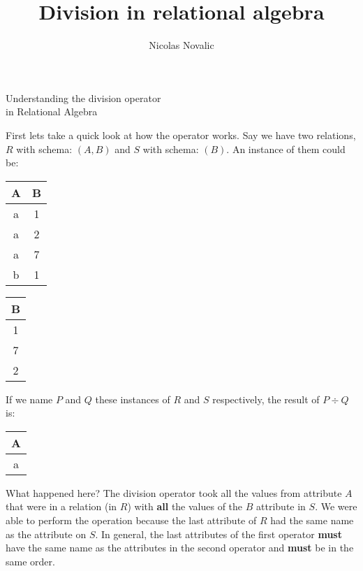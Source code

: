 \documentclass{article}
\begin{document}
\title{%
		\LARGE \textbf{Division in relational algebra} \\
        }
\author{
	Nicolas Novalic
}
\begin{center}
	{\Huge Understanding the division operator\\ in Relational Algebra} \\
\end{center}

First lets take a quick look at how the operator works. Say we have two relations, $R$ with schema: $(A, B)$ and $S$ with schema: $(B)$. An instance of them could be:
\vskip 0.2in

\parbox{.45\linewidth}{
\begin{center}
  \begin{tabular}{ll}
  	\hline
    A & B \\
    \hline
    \multicolumn{1}{|c|}{a} & \multicolumn{1}{c|}{1} \\ \hline
	\multicolumn{1}{|c|}{a} & \multicolumn{1}{c|}{2} \\ \hline
    \multicolumn{1}{|c|}{a} & \multicolumn{1}{c|}{7} \\ \hline
    \multicolumn{1}{|c|}{b} & \multicolumn{1}{c|}{1} \\ \hline
  \end{tabular}
\end{center}
}
\parbox{.45\linewidth}{
\begin{center}
  \begin{tabular}{l}
  	\hline
    B \\
    \hline
    \multicolumn{1}{|c|}{1} \\ \hline
	\multicolumn{1}{|c|}{7} \\ \hline
    \multicolumn{1}{|c|}{2} \\ \hline
  \end{tabular}
\end{center}
}
\vskip 0.2in
If we name $P$ and $Q$ these instances of $R$  and $S$ respectively, the result of $P \div Q$ is:
\vskip 0.2in
\begin{center}
  \begin{tabular}{l}
  	\hline
    A \\
    \hline
    \multicolumn{1}{|c|}{a} \\ \hline
  \end{tabular}
\end{center}
\vskip 0.2in

What happened here? The division operator took all the values from attribute $A$ that were in a relation (in $R$) with \textbf{all} the values of the $B$ attribute in $S$.
We were able to perform the operation because the last attribute of $R$ had the same name as the attribute on $S$. In general, the last attributes of the first operator \textbf{must} have the same name as the attributes in the second operator and \textbf{must} be in the same order.
\vskip 0.2in
\noindent{}
\end{document}
